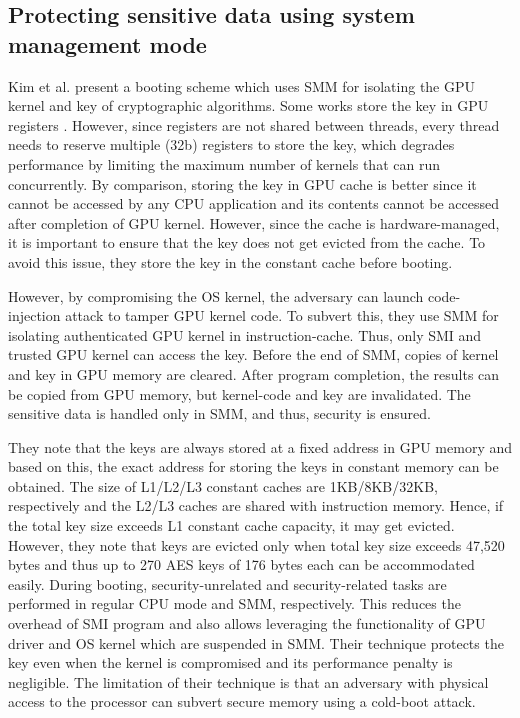 \subsection{Protecting sensitive data using system management mode}\label{sec:kimSMM}

 
Kim et al. \cite{kim2016demand} present a booting scheme which uses SMM for isolating the GPU kernel and key of cryptographic algorithms.
Some works store the key in GPU registers \cite{vasiliadis2014pixelvault}.  
However, since registers are not shared between threads, every thread needs to reserve multiple (32b) registers to store the key, which degrades performance by limiting the maximum number of  kernels that can run concurrently. By comparison, storing the key in GPU cache is better since it cannot be accessed by any CPU application and its contents cannot be accessed after completion of GPU kernel. However, since the cache is hardware-managed, it is important to ensure that the key does not get evicted from the cache. To avoid this issue, they store the key in the constant cache before booting.  

  
However, by compromising the OS kernel, the adversary can launch code-injection attack to tamper GPU kernel code. To subvert this, they use SMM for isolating authenticated GPU kernel in instruction-cache. Thus, only SMI and trusted GPU kernel can access the key. Before the end of SMM, copies of kernel and key in GPU memory are cleared. After program completion, the results can be copied from GPU memory, but kernel-code and key are invalidated.  
The sensitive data is handled only in SMM, and thus, security is ensured.  
  
They note that the keys are always stored at a fixed address in GPU memory and based on this, the exact address for storing the keys in constant memory can be obtained.  The size of L1/L2/L3 constant caches are 1KB/8KB/32KB, respectively and the L2/L3 caches are shared with instruction memory. Hence, if the total key size exceeds L1 constant cache capacity, it may get evicted.  However, they note that keys are evicted only when total key size exceeds 47,520 bytes and thus up to 270 AES keys of 176 bytes each can be accommodated easily. During booting, security-unrelated and security-related tasks are performed in regular CPU mode and SMM, respectively. This reduces the overhead of SMI program and also allows leveraging the functionality of GPU driver and OS kernel which are suspended in SMM.  Their technique protects the key even when the kernel is compromised and its performance penalty is negligible. The limitation of their technique is that an adversary with physical access to the processor can subvert secure memory using a cold-boot attack. 

